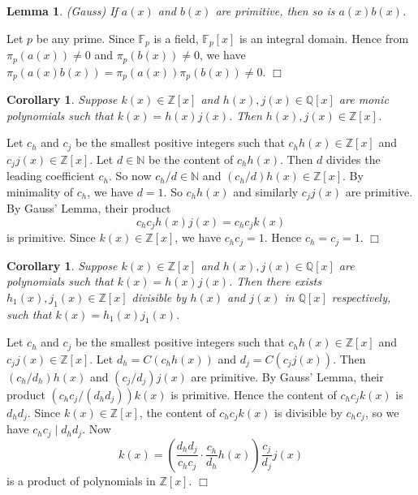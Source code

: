 \documentclass{article}
\def\Z{{\mathbb Z}}
\def\F{{\mathbb F}}
\def\N{{\mathbb N}}
\def\Q{{\mathbb Q}}
\def\Z{{\mathbb Z}}
\def\F{{\mathbb F}}
\def\Q{{\mathbb Q}}
\newtheorem{cor}[subsection]{Corollary}
\newtheorem{lemma}[subsection]{Lemma}
\newenvironment{proof}{\noindent {\bf Proof:}}{$\Box$ \vspace{2 ex}}
\begin{document}
\begin{lemma}
    (Gauss) If $a(x)$ and $b(x)$ are primitive, then so is $a(x)b(x)$.
\end{lemma}

\begin{proof}
    Let $p$ be any prime. Since $\F_p$ is a field, $\F_p[x]$ is an integral domain. Hence from $\pi_p(a(x))\neq 0$ and $\pi_p(b(x))\neq 0$, we have $\pi_p(a(x)b(x)) = \pi_p(a(x))\pi_p(b(x))\neq 0$.
\end{proof}

\begin{cor}\label{cor:Gauss}
    Suppose $k(x)\in\Z[x]$ and $h(x),j(x)\in\Q[x]$ are monic polynomials such that $k(x) = h(x)j(x)$. Then $h(x),j(x)\in\Z[x]$.
\end{cor}

\begin{proof}
    Let $c_h$ and $c_j$ be the smallest positive integers such that $c_hh(x)\in\Z[x]$ and $c_jj(x)\in\Z[x]$. Let $d\in\N$ be the content of $c_hh(x)$. Then $d$ divides the leading coefficient $c_h$. So now $c_h/d\in\N$ and $(c_h/d)h(x)\in\Z[x]$. By minimality of $c_h$, we have $d = 1$. So $c_hh(x)$ and similarly $c_jj(x)$ are primitive. By Gauss' Lemma, their product $$c_hc_j h(x)j(x) = c_hc_j k(x)$$ is primitive. Since $k(x)\in\Z[x]$, we have $c_hc_j = 1$. Hence $c_h = c_j = 1$.
\end{proof}

\begin{cor}\label{cor:factorQ}
    Suppose $k(x)\in\Z[x]$ and $h(x),j(x)\in\Q[x]$ are polynomials such that $k(x) = h(x)j(x)$. Then there exists $h_1(x),j_1(x)\in\Z[x]$ divisible by $h(x)$ and $j(x)$ in $\Q[x]$ respectively, such that $k(x) = h_1(x)j_1(x)$.
\end{cor}

\begin{proof}
    Let $c_h$ and $c_j$ be the smallest positive integers such that $c_hh(x)\in\Z[x]$ and $c_jj(x)\in\Z[x]$. Let $d_h = C(c_hh(x))$ and $d_j = C(c_jj(x))$. Then $(c_h/d_h)h(x)$ and $(c_j/d_j)j(x)$ are primitive. By Gauss' Lemma, their product $(c_hc_j/(d_hd_j))k(x)$ is primitive. Hence the content of $c_hc_jk(x)$ is $d_hd_j$. Since $k(x)\in\Z[x]$, the content of $c_hc_jk(x)$ is divisible by $c_hc_j$, so we have $c_hc_j \mid d_h d_j$. Now
    $$k(x) = \left(\frac{d_hd_j}{c_hc_j} \cdot \frac{c_h}{d_h}h(x)\right) \frac{c_j}{d_j}j(x)$$
    is a product of polynomials in $\Z[x]$.
\end{proof}
\end{document}

